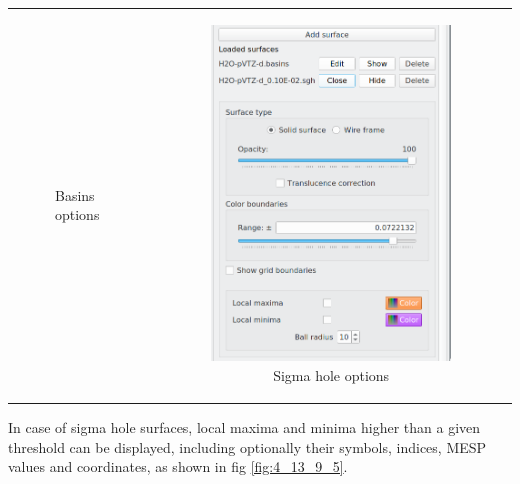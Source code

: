 \documentclass[10pt]{article}
\begin{document}
\begin{tabular}{lcr}
\begin{minipage}{.3\linewidth}
\begin{figure}[H]
\begin{center}
        \end{center}
        \vspace*{15mm}
        \caption{Basins options \label{fig:4_13_9_2}}
    \end{figure}
\end{minipage}
&
\begin{minipage}{.3\linewidth}
    \begin{figure}[H]
        \begin{center}
            \includegraphics[width=0.75\linewidth]{damqt320_sgh_menu.png} 
        \end{center}
        \vspace*{-0.5mm}
        \caption{Sigma hole options \label{fig:4_13_9_3}}
    \end{figure}
\end{minipage}
\end{tabular}
\vspace*{5mm}

In case of sigma hole surfaces, local maxima and minima higher than a given threshold
can be displayed, including optionally their symbols, indices, MESP values and coordinates,
as shown in fig \ref{fig:4_13_9_5}.
\end{document}
